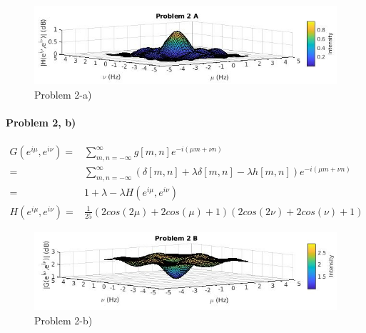 \documentclass[11pt]{article}
\begin{document}
\begin{figure}[htbp]
    \centerline{\includegraphics[scale=.5]{2A.JPG}}
    \caption{Problem 2-a)}
    \label{fig}
\end{figure}

\paragraph{\noindent\textbf{\LARGE{Problem 2, b)}}}    
\begin{equation*}
\begin{split}
    G(e^{i\mu}, e^{i\nu}) = &\sum_{m,n = -\infty }^\infty g[m,n] e^{-i(\mu m + \nu n)} \\
    = & \sum_{m,n = -\infty }^\infty (\delta[m,n] + \lambda \delta[m,n] - \lambda h[m,n]) e^{-i(\mu m + \nu n)} \\                    
    = & 1 + \lambda - \lambda H(e^{i\mu}, e^{i\nu}) \\
    H(e^{i\mu}, e^{i\nu}) = &  \frac{1}{25} (2 cos(2 \mu) + 2 cos(\mu) + 1) (2 cos(2 \nu) + 2 cos(\nu) + 1)
\end{split}
\end{equation*}

\begin{figure}[htbp]
    \centerline{\includegraphics[scale=.5]{2B.JPG}}
    \caption{Problem 2-b)}
    \label{fig}
\end{figure}
\end{document}

